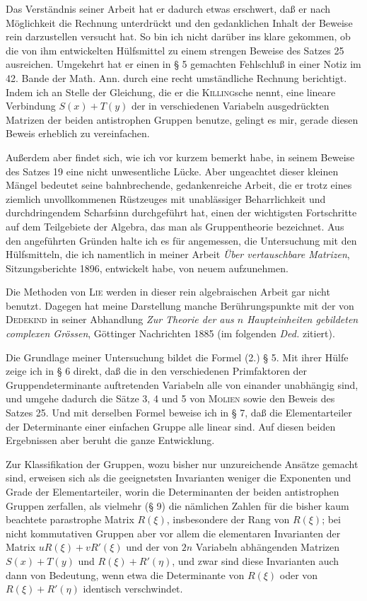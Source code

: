 \documentclass[11pt]{article}
\begin{document}
Das Verständnis seiner Arbeit hat er dadurch etwas erschwert, daß er nach Möglichkeit die Rechnung unterdrückt und den gedanklichen Inhalt der Beweise rein darzustellen versucht hat. So bin ich nicht darüber ins klare gekommen, ob die von ihm entwickelten Hülfsmittel zu einem strengen Beweise des Satzes 25 ausreichen. Umgekehrt hat er einen in § 5 gemachten Fehlschluß in einer Notiz im 42. Bande der Math. Ann. durch eine recht umständliche Rechnung berichtigt. Indem ich an Stelle der Gleichung, die er die \textsc{Killing}sche nennt, eine lineare Verbindung $S(x)+T(y)$ der in verschiedenen Variabeln ausgedrückten Matrizen der beiden antistrophen Gruppen benutze, gelingt es mir, gerade diesen Beweis erheblich zu vereinfachen.

Außerdem aber findet sich, wie ich vor kurzem bemerkt habe, in seinem Beweise des Satzes 19 eine nicht unwesentliche Lücke. Aber ungeachtet dieser kleinen Mängel bedeutet seine bahnbrechende, gedankenreiche Arbeit, die er trotz eines ziemlich unvollkommenen Rüstzeuges mit unablässiger Beharrlichkeit und durchdringendem Scharfsinn durchgeführt hat, einen der wichtigsten Fortschritte auf dem Teilgebiete der Algebra, das man als Gruppentheorie bezeichnet. Aus den angeführten Gründen halte ich es für angemessen, die Untersuchung mit den Hülfsmitteln, die ich namentlich in meiner Arbeit \emph{Über vertauschbare Matrizen}, Sitzungsberichte 1896, entwickelt habe, von neuem aufzunehmen.

Die Methoden von \textsc{Lie} werden in dieser rein algebraischen Arbeit gar nicht benutzt. Dagegen hat meine Darstellung manche Berührungspunkte mit der von \textsc{Dedekind} in seiner Abhandlung \emph{Zur Theorie der aus $n$ Haupteinheiten gebildeten complexen Grössen}, Göttinger Nachrichten 1885 (im folgenden \emph{Ded.} zitiert).

Die Grundlage meiner Untersuchung bildet die Formel (2.) § 5. Mit ihrer Hülfe zeige ich in § 6 direkt, daß die in den verschiedenen Primfaktoren der Gruppendeterminante auftretenden Variabeln alle von einander unabhängig sind, und umgehe dadurch die Sätze 3, 4 und 5 von \textsc{Molien} sowie den Beweis des Satzes 25. Und mit derselben Formel beweise ich in § 7, daß die Elementarteiler der Determinante einer einfachen Gruppe alle linear sind. Auf diesen beiden Ergebnissen aber beruht die ganze Entwicklung.

Zur Klassifikation der Gruppen, wozu bisher nur unzureichende Ansätze gemacht sind, erweisen sich als die geeignetsten Invarianten weniger die Exponenten und Grade der Elementarteiler, worin die Determinanten der beiden antistrophen Gruppen zerfallen, als vielmehr (§ 9) die nämlichen Zahlen für die bisher kaum beachtete parastrophe Matrix $R(\xi)$, insbesondere der Rang von $R(\xi)$; bei nicht kommutativen Gruppen aber vor allem die elementaren Invarianten der Matrix $uR(\xi)+vR'(\xi)$ und der von $2n$ Variabeln abhängenden Matrizen $S(x)+T(y)$ und $R(\xi)+R'(\eta)$, und zwar sind diese Invarianten auch dann von Bedeutung, wenn etwa die Determinante von $R(\xi)$ oder von $R(\xi)+R'(\eta)$ identisch verschwindet.
\end{document}
